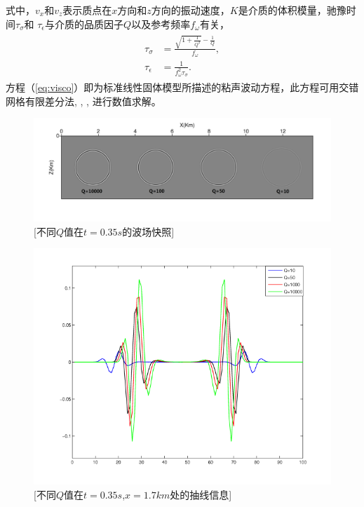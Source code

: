 式中，$v_x$和$v_z$表示质点在$x$方向和$z$方向的振动速度，$K$是介质的体积模量，驰豫时间$\tau_\sigma$和
$\tau_\epsilon$与介质的品质因子$Q$以及参考频率$f_\omega$有关，
\begin{eqnarray}
    \begin{aligned}
        \tau_\sigma &= \frac{\sqrt{1+\frac{1}{Q^2}}-\frac{1}{Q}}{f_\omega},\\
        \tau_\epsilon &= \frac{1}{f_\omega^2\tau_\sigma}.
    \end{aligned}
\end{eqnarray}
方程（\ref{eq:visco}）即为标准线性固体模型所描述的粘声波动方程，此方程可用交错网格有限差分法, ,
, 进行数值求解。

\begin{figure}[!htbp]
	    \centering
		\includegraphics[width=1.0\linewidth]{figure/wave_sls1}
		[不同$Q$值在$t=0.35s$的波场快照]
		\label{fig:wave_sls1}
\end{figure}
\begin{figure}[!htbp]
	    \centering
		\includegraphics[width=0.5\linewidth]{figure/wave_sls3}
		[不同$Q$值在$t=0.35s$,$x=1.7km$处的抽线信息]
		\label{fig:wave_sls3}
\end{figure}
